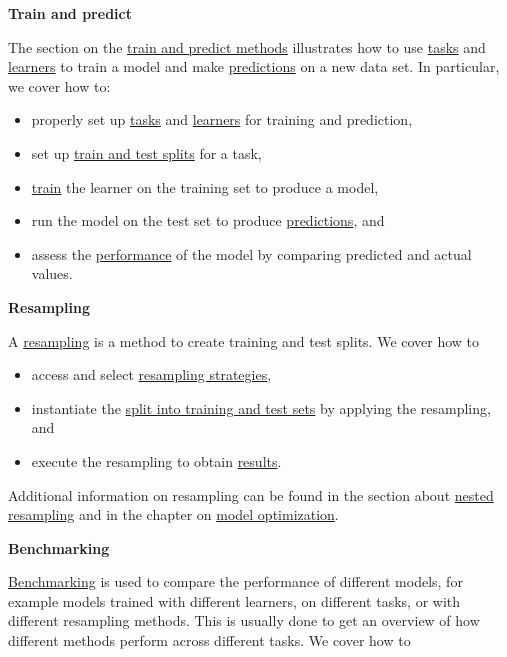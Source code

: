\documentclass[
]{scrbook}
\providecommand{\tightlist}{%
  \setlength{\itemsep}{0pt}\setlength{\parskip}{0pt}}
\begin{document}
\textbf{Train and predict}

The section on the \protect\hyperlink{train-predict}{train and predict methods} illustrates how to use \protect\hyperlink{tasks}{tasks} and \protect\hyperlink{learners}{learners} to train a model and make \protect\hyperlink{predicting}{predictions} on a new data set.
In particular, we cover how to:

\begin{itemize}
\tightlist
\item
  properly set up \protect\hyperlink{train-predict-objects}{tasks} and \protect\hyperlink{train-predict-objects}{learners} for training and prediction,
\item
  set up \protect\hyperlink{split-data}{train and test splits} for a task,
\item
  \protect\hyperlink{training}{train} the learner on the training set to produce a model,
\item
  run the model on the test set to produce \protect\hyperlink{predicting}{predictions}, and
\item
  assess the \protect\hyperlink{measure}{performance} of the model by comparing predicted and actual values.
\end{itemize}

\textbf{Resampling}

A \protect\hyperlink{resampling}{resampling} is a method to create training and test splits.
We cover how to

\begin{itemize}
\tightlist
\item
  access and select \protect\hyperlink{resampling-settings}{resampling strategies},
\item
  instantiate the \protect\hyperlink{resampling-inst}{split into training and test sets} by applying the resampling, and
\item
  execute the resampling to obtain \protect\hyperlink{resampling-exec}{results}.
\end{itemize}

Additional information on resampling can be found in the section about \protect\hyperlink{nested-resampling}{nested resampling} and in the chapter on \protect\hyperlink{optimization}{model optimization}.

\textbf{Benchmarking}

\protect\hyperlink{benchmarking}{Benchmarking} is used to compare the performance of different models, for example models trained with different learners, on different tasks, or with different resampling methods.
This is usually done to get an overview of how different methods perform across different tasks.
We cover how to
\end{document}
